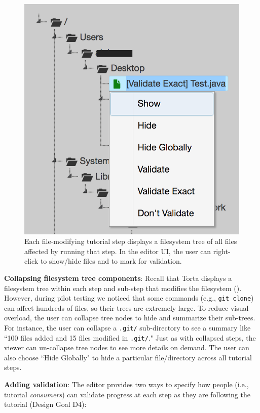 \begin{figure}

\centering
\includegraphics[width=0.56\columnwidth]{figures/torta/filesystem-tree.png}

\caption{Each file-modifying tutorial step displays a filesystem tree of
all files affected by running that step. In the editor UI, the user can
right-click to show/hide files and to mark for validation.}

\label{fig:torta-fstree}
\vspace{-0.5em} %
\end{figure}


\textbf{Collapsing filesystem tree components}: Recall that Torta
displays a filesystem tree within each step and
sub-step that modifies the filesystem (). However,
during pilot testing we
noticed that some commands (e.g., {\small \texttt{git clone}}) can
affect hundreds of files, so their trees are extremely large. To reduce
visual overload, the user can collapse tree nodes to hide and summarize
their sub-trees. For instance, the user can
collapse a {\small \texttt{.git/}} sub-directory to see a summary like
``100 files added and 15 files modified in \texttt{.git/}." Just as with
collapsed steps, the viewer can un-collapse tree nodes to see more details
on demand. The user can also choose ``Hide Globally" to hide a
particular file/directory across all tutorial steps.



\textbf{Adding validation}: The editor provides two ways to specify how
people (i.e., tutorial \emph{consumers}) can validate progress at each
step as they are following the tutorial (Design Goal D4):

